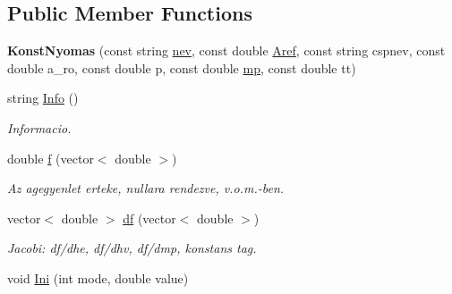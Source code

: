 \subsection*{Public Member Functions}
\begin{DoxyCompactItemize}
\item 
{\bfseries Konst\+Nyomas} (const string \hyperlink{class_agelem_abe92b7e3912367d5d1caf6b277ca0b7d}{nev}, const double \hyperlink{class_agelem_a3f8668febc2958fd539997d537552f17}{Aref}, const string cspnev, const double a\+\_\+ro, const double p, const double \hyperlink{class_agelem_a1377d80d8511cc4adacccba31d28282d}{mp}, const double tt)\hypertarget{class_konst_nyomas_a729b5f380b7ea5792484e963b1383f34}{}\label{class_konst_nyomas_a729b5f380b7ea5792484e963b1383f34}

\item 
string \hyperlink{class_konst_nyomas_a61f8d31204f60c216808fce1da451c30}{Info} ()\hypertarget{class_konst_nyomas_a61f8d31204f60c216808fce1da451c30}{}\label{class_konst_nyomas_a61f8d31204f60c216808fce1da451c30}

\begin{DoxyCompactList}\small\item\em Informacio. \end{DoxyCompactList}\item 
double \hyperlink{class_konst_nyomas_a71a45ebdb2f27a8f69b9988f8ac5f50c}{f} (vector$<$ double $>$)\hypertarget{class_konst_nyomas_a71a45ebdb2f27a8f69b9988f8ac5f50c}{}\label{class_konst_nyomas_a71a45ebdb2f27a8f69b9988f8ac5f50c}

\begin{DoxyCompactList}\small\item\em Az agegyenlet erteke, nullara rendezve, v.\+o.\+m.-\/ben. \end{DoxyCompactList}\item 
vector$<$ double $>$ \hyperlink{class_konst_nyomas_ab8b056adc0788048a2b32f5378ef07b4}{df} (vector$<$ double $>$)\hypertarget{class_konst_nyomas_ab8b056adc0788048a2b32f5378ef07b4}{}\label{class_konst_nyomas_ab8b056adc0788048a2b32f5378ef07b4}

\begin{DoxyCompactList}\small\item\em Jacobi\+: df/dhe, df/dhv, df/dmp, konstans tag. \end{DoxyCompactList}\item 
void \hyperlink{class_konst_nyomas_a9f949a7c2430ade86328f9f0c5189797}{Ini} (int mode, double value)\hypertarget{class_konst_nyomas_a9f949a7c2430ade86328f9f0c5189797}{}\label{class_konst_nyomas_a9f949a7c2430ade86328f9f0c5189797}


\end{DoxyCompactItemize}

